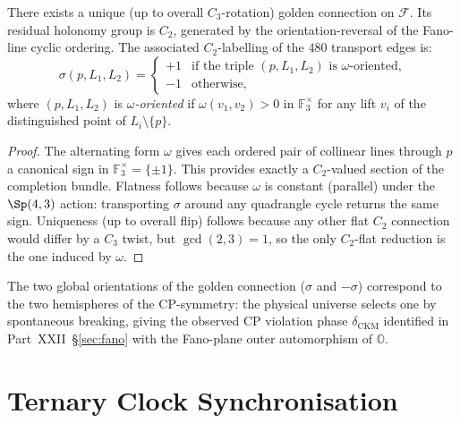 \begin{theorem}
\label{thm:golden_unique}
There exists a unique (up to overall $C_3$-rotation) golden connection
on $\mathcal{F}$.  Its residual holonomy group is $C_2$, generated by
the orientation-reversal of the Fano-line cyclic ordering.  The
associated $C_2$-labelling of the $480$ transport edges is:
\begin{equation}
  \sigma(p,L_1,L_2) = \begin{cases}
    +1 & \text{if the triple }(p,L_1,L_2)\text{ is }\omega\text{-oriented,}\\
    -1 & \text{otherwise,}
  \end{cases}
  \label{eq:sigma}
\end{equation}
where $(p,L_1,L_2)$ is \emph{$\omega$-oriented} if $\omega(v_1,v_2)>0$
in $\mathbb{F}_3^\times$ for any lift $v_i$ of the distinguished point
of $L_i\setminus\{p\}$.
\end{theorem}

\begin{proof}
The alternating form $\omega$ gives each ordered pair of collinear
lines through $p$ a canonical sign in $\mathbb{F}_3^\times=\{\pm 1\}$.
This provides exactly a $C_2$-valued section of the completion bundle.
Flatness follows because $\omega$ is constant (parallel) under the
$\Sp(4,3)$ action: transporting $\sigma$ around any quadrangle cycle
returns the same sign.
Uniqueness (up to overall flip) follows because any other flat $C_2$
connection would differ by a $C_3$ twist, but $\gcd(2,3)=1$, so the
only $C_2$-flat reduction is the one induced by $\omega$.
\qedhere
\end{proof}

\begin{corollary}
\label{cor:CP}
The two global orientations of the golden connection
($\sigma$ and $-\sigma$) correspond to the two hemispheres
of the $\mathrm{CP}$-symmetry: the physical universe selects
one by spontaneous breaking, giving the observed $\mathrm{CP}$
violation phase $\delta_{\mathrm{CKM}}$ identified in
Part~XXII~\S\ref{sec:fano} with the Fano-plane outer automorphism
of $\mathbb{O}$.
\end{corollary}

\section{Ternary Clock Synchronisation}
\label{sec:ternary_clock}

